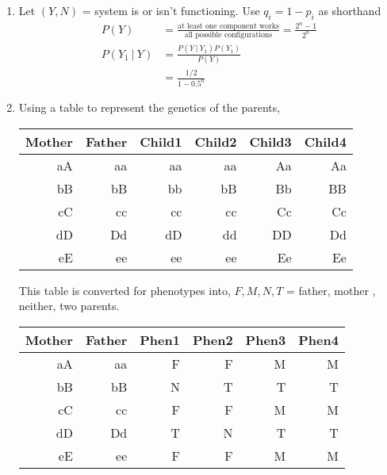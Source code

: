 \begin{enumerate}
	\item Let $ (Y, N) $ = system is or isn't functioning.  Use $ q_i = 1 - p_i $ as shorthand\\
	
		\begin{align}
			P(Y) &= \frac{\text{at least one component works}}{\text{all possible configurations}} = \frac{2^n - 1}{2^n} \\
			P(Y_1\ |\ Y) &= \frac{P(Y\ |\ Y_1) P(Y_1)}{P(Y)} \\
			&= \frac{1/2}{1 - 0.5^n}
		\end{align}
	
	
	\item 	Using a table to represent the genetics of the parents, 
	\begin{table}[H]
		\centering
		\begin{tabular}{@{}rr|rrrr@{}}
			\toprule
			Mother & Father & Child1 & Child2 & Child3 & Child4 \\ \midrule
			aA     & aa		& aa	 & aa 	  & Aa 	   & Aa   \\
			bB     & bB     & bb	 & bB 	  & Bb 	   & BB    \\
			cC     & cc     & cc	 & cc 	  & Cc 	   & Cc    \\
			dD     & Dd     & dD	 & dd 	  & DD 	   & Dd    \\
			eE     & ee     & ee	 & ee 	  & Ee 	   & Ee    \\ \bottomrule
		\end{tabular}
	\end{table}
	
	This table is converted for phenotypes into, $ F, M, N, T $ = father, mother , neither, two parents.
	
	\begin{table}[H]
		\centering
		\begin{tabular}{@{}rr|rrrr@{}}
			\toprule
			Mother & Father & Phen1 & Phen2 & Phen3 & Phen4 \\ \midrule
			aA     & aa		& F	 & F 	  & M 	   & M   \\
			bB     & bB     & N	 & T 	  & T 	   & T    \\
			cC     & cc     & F	 & F 	  & M 	   & M    \\
			dD     & Dd     & T	 & N 	  & T 	   & T    \\
			eE     & ee     & F	 & F 	  & M 	   & M    \\ \bottomrule
		\end{tabular}
	\end{table}
	

\end{enumerate}
